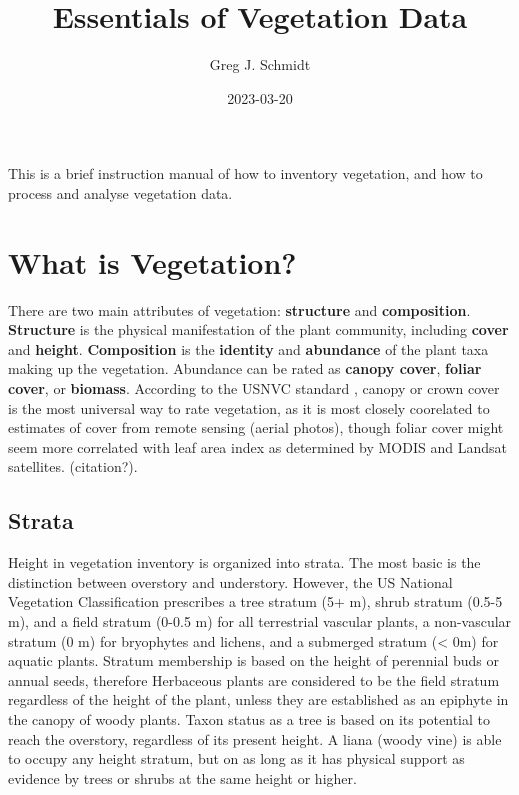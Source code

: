 \documentclass[
]{book}
\title{Essentials of Vegetation Data}
\author{Greg J. Schmidt}
\date{2023-03-20}
\begin{document}
\maketitle

{
\setcounter{tocdepth}{1}
\tableofcontents
}
This is a brief instruction manual of how to inventory vegetation, and how to process and analyse vegetation data.

\hypertarget{what-is-vegetation}{%
\chapter{What is Vegetation?}\label{what-is-vegetation}}

There are two main attributes of vegetation: \textbf{structure} and \textbf{composition}. \textbf{Structure} is the physical manifestation of the plant community, including \textbf{cover} and \textbf{height}. \textbf{Composition} is the \textbf{identity} and \textbf{abundance} of the plant taxa making up the vegetation. Abundance can be rated as \textbf{canopy cover}, \textbf{foliar cover}, or \textbf{biomass}. According to the USNVC standard \citep{usnvc2008}, canopy or crown cover is the most universal way to rate vegetation, as it is most closely coorelated to estimates of cover from remote sensing (aerial photos), though foliar cover might seem more correlated with leaf area index as determined by MODIS and Landsat satellites. (citation?).

\hypertarget{strata}{%
\section{Strata}\label{strata}}

Height in vegetation inventory is organized into strata. The most basic is the distinction between overstory and understory. However, the US National Vegetation Classification \citep{usnvc2008} prescribes a tree stratum (5+ m), shrub stratum (0.5-5 m), and a field stratum (0-0.5 m) for all terrestrial vascular plants, a non-vascular stratum (0 m) for bryophytes and lichens, and a submerged stratum (\textless{} 0m) for aquatic plants. Stratum membership is based on the height of perennial buds or annual seeds, therefore Herbaceous plants are considered to be the field stratum regardless of the height of the plant, unless they are established as an epiphyte in the canopy of woody plants. Taxon status as a tree is based on its potential to reach the overstory, regardless of its present height. A liana (woody vine) is able to occupy any height stratum, but on as long as it has physical support as evidence by trees or shrubs at the same height or higher.
\end{document}
